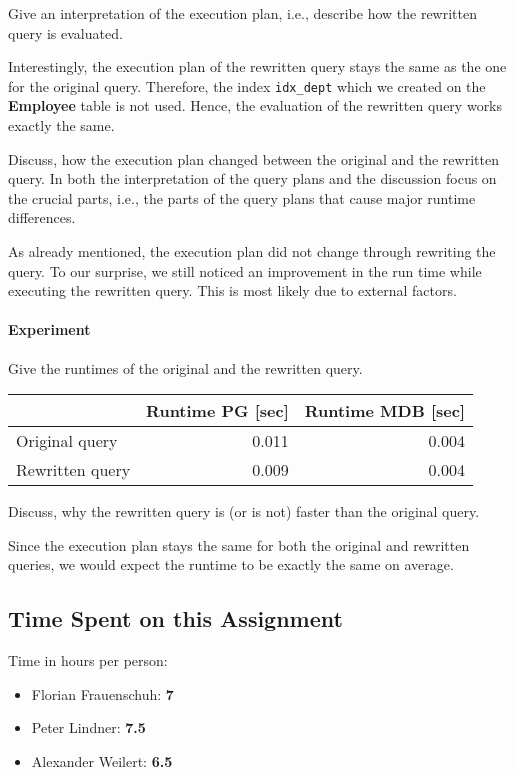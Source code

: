 \documentclass[11pt]{scrartcl}
\begin{document}
    Give an interpretation of the execution plan, i.e., describe how the rewritten query is evaluated.

    Interestingly, the execution plan of the rewritten query stays the same as the one for the original query.
    Therefore, the index \texttt{idx\_dept} which we created on the \textbf{Employee} table is not used.
    Hence, the evaluation of the rewritten query works exactly the same.

    Discuss, how the execution plan changed between the original and the rewritten query.
    In both the interpretation of the query plans and the discussion focus on the crucial parts, i.e., the parts of the
    query plans that cause major runtime differences.

    As already mentioned, the execution plan did not change through rewriting the query.
    To our surprise, we still noticed an improvement in the run time while executing the rewritten query.
    This is most likely due to external factors.

    \paragraph{Experiment}

    Give the runtimes of the original and the rewritten query.

    \begin{table}[H]
        \centering
        \begin{tabular}{l|r|r}
            & Runtime PG [sec] & Runtime MDB [sec] \tabularnewline
            \hline
            Original query & 0.011 & 0.004 \tabularnewline
            Rewritten query & 0.009 & 0.004 \tabularnewline
        \end{tabular}
    \end{table}

    Discuss, why the rewritten query is (or is not) faster than the original query.

    Since the execution plan stays the same for both the original and rewritten queries, we would expect the runtime
    to be exactly the same on average.

    \subsection*{Time Spent on this Assignment}

    Time in hours per person:
    \begin{itemize}
        \item Florian Frauenschuh: \textbf{7}
        \item Peter Lindner: \textbf{7.5}
        \item Alexander Weilert: \textbf{6.5}
    \end{itemize}

    \pagebreak

    \printbibliography[title=References]
\end{document}
